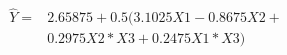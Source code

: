 

\[
\begin{array}{ll} \hat{Y} = & 2.65875 +  0.5(3.1025X1 - 0.8675X2 + \\ &0.2975X2*X3 + 0.2475X1*X3) \end{array}
\]



